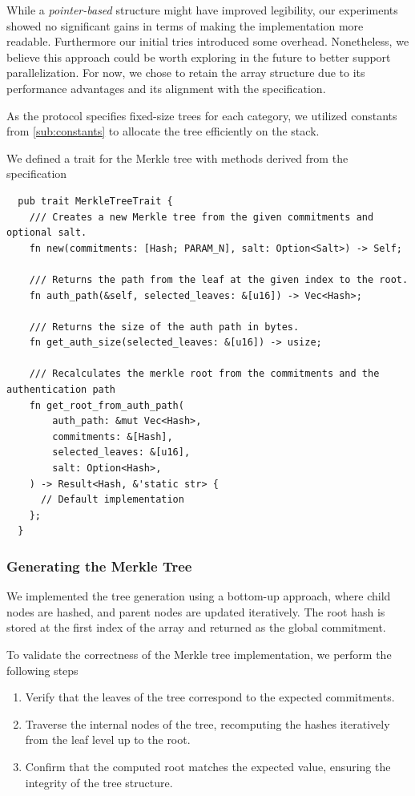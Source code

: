 \documentclass[11pt]{report}
\theoremstyle{definition}
\theoremstyle{plain}
\begin{document}
While a \textit{pointer-based} structure might have improved legibility, our experiments showed no significant gains in terms of making the implementation more readable. Furthermore our initial tries introduced some overhead. Nonetheless, we believe this approach could be worth exploring in the future to better support parallelization. For now, we chose to retain the array structure due to its performance advantages and its alignment with the specification.

As the protocol specifies fixed-size trees for each category, we utilized constants from \autoref{sub:constants} to allocate the tree efficiently on the stack.

We defined a trait for the Merkle tree with methods derived from the specification
\begin{verbatim}
  pub trait MerkleTreeTrait {
    /// Creates a new Merkle tree from the given commitments and optional salt.
    fn new(commitments: [Hash; PARAM_N], salt: Option<Salt>) -> Self;

    /// Returns the path from the leaf at the given index to the root.
    fn auth_path(&self, selected_leaves: &[u16]) -> Vec<Hash>;

    /// Returns the size of the auth path in bytes.
    fn get_auth_size(selected_leaves: &[u16]) -> usize;

    /// Recalculates the merkle root from the commitments and the authentication path
    fn get_root_from_auth_path(
        auth_path: &mut Vec<Hash>,
        commitments: &[Hash],
        selected_leaves: &[u16],
        salt: Option<Hash>,
    ) -> Result<Hash, &'static str> {
      // Default implementation
    };
  }
\end{verbatim}

\subsubsection{Generating the Merkle Tree}\label{sec:new}

We implemented the tree generation using a bottom-up approach, where child nodes are hashed, and parent nodes are updated iteratively. The root hash is stored at the first index of the array and returned as the global commitment.

To validate the correctness of the Merkle tree implementation, we perform the following steps

\begin{enumerate}[parsep=0pt, itemsep=0pt]
  \item Verify that the leaves of the tree correspond to the expected commitments.
  \item Traverse the internal nodes of the tree, recomputing the hashes iteratively from the leaf level up to the root.
  \item Confirm that the computed root matches the expected value, ensuring the integrity of the tree structure.
\end{enumerate}
\end{document}
